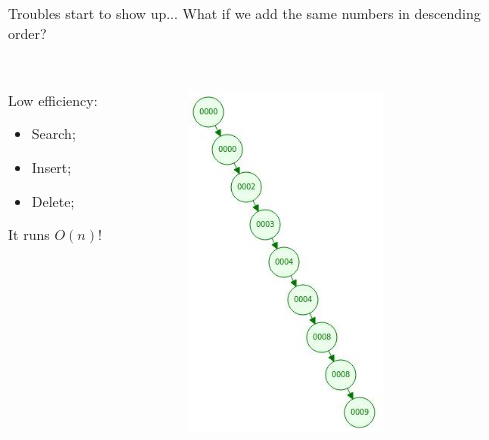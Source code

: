 \documentclass{beamer}
\begin{document}
\begin{frame}{Troubles start to show up...}
\justifying
What if we add the same numbers in descending order?\\ \\
\begin{columns}
\begin{column}{0.5\textwidth}
   \begin{block}{Low efficiency:}\end{block}
   \begin{itemize}
       \item Search;
       \item Insert;
       \item Delete;
   \end{itemize}
   \begin{block}{It runs $O(n)$!}\end{block}
\end{column}
\begin{column}{0.5\textwidth}
    \begin{center}
     \includegraphics[width=0.6\textwidth]{bst_order.jpeg}
     \end{center}
\end{column}
\end{columns}
\end{frame}
\end{document}
